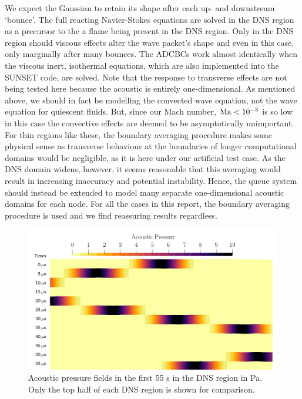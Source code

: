 We expect the Gaussian to retain its shape after each up- and downstream `bounce'. The full reacting Navier-Stokes equations are solved in the DNS region as a precursor to the a flame being present in the DNS region. Only in the DNS region should viscous effects alter the wave packet's shape and even in this case, only marginally after many bounces. The ADCBCs work almost identically when the viscous inert, isothermal equations, which are also implemented into the SUNSET code, are solved. Note that the response to transverse effects are not being tested here because the acoustic is entirely one-dimensional. As mentioned above, we should in fact be modelling the convected wave equation, not the wave equation for quiescent fluids. But, since our Mach number, $\mathrm{Ma} < 10^{-3}$ is so low in this case the convective effects are deemed to be asymptotically unimportant. For thin regions like these, the boundary averaging procedure makes some physical sense as transverse behaviour at the boundaries of longer computational domains would be negligible, as it is here under our artificial test case. As the DNS domain widens, however, it seems reasonable that this averaging would result in increasing inaccuracy and potential instability. Hence, the queue system should instead be extended to model many separate one-dimensional acoustic domains for each node. For all the cases in this report, the boundary averaging procedure is used and we find reassuring results regardless.

\begin{figure}[t]
\centering
\includegraphics[scale=0.30]{assets/graphs/AC_BUMP_first_bounces_comp.png}
\caption{Acoustic pressure fields in the first 55 {\textmu}s in the DNS region in Pa. Only the top half of each DNS region is shown for comparison.}
\label{fig:ac-bump-dns}
\end{figure}

